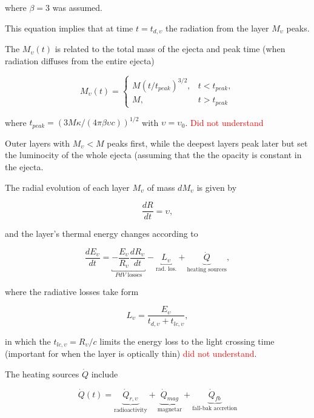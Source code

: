 \documentclass[11pt,a4paper,headinclude=true,DIV=14,BCOR=8mm,chapterprefix,listof=totoc,twoside,openright,abstracton]{scrbook}
\newcommand{\red}[1]{\textcolor{red}{#1}}
\begin{document}
where $\beta=3$ was assumed. 

This equation implies that at time $t=t_{d,\upsilon}$ the radiation from the layer $M_{\upsilon}$ peaks.

The $M_{\upsilon}(t)$ is related to the total mass of the ejecta and peak time (when radiation diffuses from the entire ejecta)

\begin{equation}
    M_{\upsilon}(t) = 
    \begin{cases}
        M(t/t_{peak})^{3/2},& t<t_{peak}, \\
        M, &t>t_{peak}
    \end{cases}
\end{equation}

where $t_{peak} = (3M\kappa / (4\pi \beta \upsilon c))^{1/2}$ with $\upsilon = \upsilon_0$. \red{Did not understand}

Outer layers with $M_{\upsilon} < M$ peaks first, while the deepest layers peak later but set the luminocity of the whole ejecta (assuming that the the opacity is constant in the ejecta. 

The radial evolution of each layer $M_{\upsilon}$ of mass $dM_{\upsilon}$ is given by 

\begin{equation}
    \frac{dR}{dt} = \upsilon,
\end{equation}

and the layer's thermal energy changes according to 

\begin{equation}
    \label{eq:theory:mkn:energ}
    \frac{dE_{\upsilon}}{dt} = \underbracket{-\frac{E_{\upsilon}}{R_{\upsilon}} \frac{dR_{\upsilon}}{dt}}_{PdV\text{ losses}} - \underbracket{L_{\upsilon}}_{\text{rad. los.}} + \underbrace{\dot{Q}}_{\text{heating sources}},
\end{equation}

where the radiative losses take form

\begin{equation}
    L_{\upsilon} = \frac{E_{\upsilon}}{t_{d,\upsilon} + t_{lc,\upsilon}},
\end{equation}

in which the $t_{lc,\upsilon} = R_{\upsilon}/c$ limits the energy loss to the light crossing time (important for when the layer is optically thin) \red{did not understand}.

The heating sources $\dot{Q}$ include

\begin{equation}
    \dot{Q}(t) = \underbrace{\dot{Q}_{r,\upsilon}}_{\text{radioactivity}} + \underbrace{\dot{Q}_{mag}}_{\text{magnetar}} + \underbrace{\dot{Q}_{fb}}_{\text{fall-bak accretion}}
\end{equation}
\end{document}
